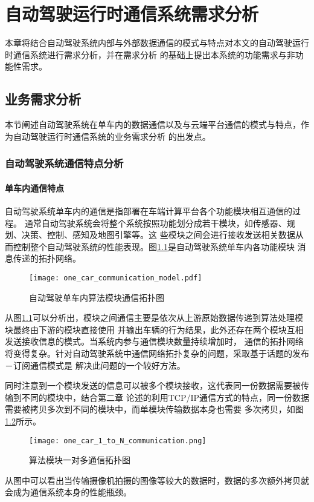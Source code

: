 \chapter{自动驾驶运行时通信系统需求分析}
本章将结合自动驾驶系统内部与外部数据通信的模式与特点对本文的自动驾驶运行时通信系统进行需求分析，并在需求分析
的基础上提出本系统的功能需求与非功能性需求。
\section{业务需求分析}
本节阐述自动驾驶系统在单车内的数据通信以及与云端平台通信的模式与特点，作为自动驾驶运行时通信系统的业务需求分析
的出发点。
\subsection{自动驾驶系统通信特点分析}
\subsubsection{单车内通信特点}
自动驾驶系统单车内的通信是指部署在车端计算平台各个功能模块相互通信的过程。
通常自动驾驶系统会将整个系统按照功能划分成若干模块，如传感器、规划、决策、控制、感知及地图引擎等。这
些模块之间会进行接收发送相关数据从而控制整个自动驾驶系统的性能表现。图\ref{one_car_communication_model}是自动驾驶系统单车内各功能模块
消息传递的拓扑网络。
\begin{figure}[H]
  \centering
  \texttt{[image: one\_car\_communication\_model.pdf]}
  \caption{自动驾驶单车内算法模块通信拓扑图}
  \label{one_car_communication_model}
\end{figure}
从图\ref{one_car_communication_model}可以分析出，模块之间通信主要是依次从上游原始数据传递到算法处理模块最终由下游的模块直接使用
并输出车辆的行为结果，此外还存在两个模块互相发送接收信息的模式。当系统内参与通信模块数量持续增加时，
通信的拓扑网络将变得复杂。针对自动驾驶系统中通信网络拓扑复杂的问题，采取基于话题的发布－订阅通信模式是
解决此问题的一个较好方法。

同时注意到一个模块发送的信息可以被多个模块接收，这代表同一份数据需要被传输到不同的模块中，结合第二章
论述的利用TCP/IP通信方式的特点，同一份数据需要被拷贝多次到不同的模块中，而单模块传输数据本身也需要
多次拷贝，如图\ref{one_car_1_to_N_communication}\cite{9488177}所示。
\begin{figure}[H]
  \centering
  \texttt{[image: one\_car\_1\_to\_N\_communication.png]}
  \caption{算法模块一对多通信拓扑图}
  \label{one_car_1_to_N_communication}
\end{figure}
从图中可以看出当传输摄像机拍摄的图像等较大的数据时，数据的多次额外拷贝就会成为通信系统本身的性能瓶颈。
